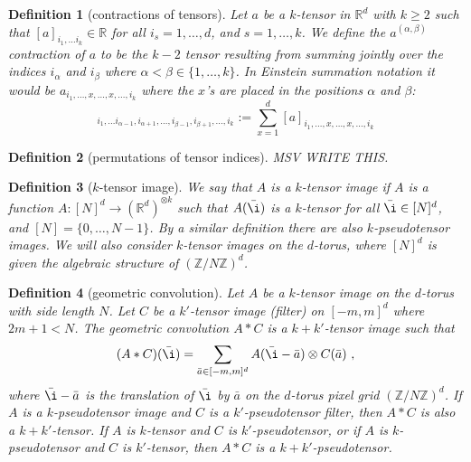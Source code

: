 \documentclass{article}
\theoremstyle{plain}
\newtheorem{definition}{Definition}
\begin{document}
\begin{definition}[contractions of tensors]
Let $a$ be a $k$-tensor in $\mathbb R^d$ with $k\geq 2$ such that $[a]_{i_1,\ldots i_k}\in \mathbb R$ for all $i_s = 1,\ldots, d$, and $s=1,\ldots, k$. We define the $a^{(\alpha,\beta)}$ contraction of $a$ to be the $k-2$ tensor resulting from summing jointly over the indices $i_\alpha$ and $i_\beta$ where $\alpha < \beta \in\{1,\ldots, k\}$. In Einstein summation notation it would be $a_{i_1, \ldots, x, \ldots , x, \ldots, i_k}$ where the $x$'s are placed in the positions $\alpha$ and $\beta$:
\begin{equation}
[a^{(\alpha,\beta)}]_{i_1,\ldots i_{\alpha-1}, i_{\alpha+1}, \ldots, i_{\beta-1}, i_{\beta+1} , \ldots, i_k} := \sum_{x=1}^d [a]_{i_1, \ldots, x, \ldots , x, \ldots, i_k}
\end{equation}
\end{definition}

\begin{definition}[permutations of tensor indices]
MSV WRITE THIS.
\end{definition}

\begin{definition}[$k$-tensor image]
We say that $A$ is a $k$-tensor image if $A$ is a function $A: [N]^d \to (\mathbb R^d)^{\otimes k}$ such that $A(\bar \i)$ is a $k$-tensor for all $\bar \i \in [N]^d$, and $[N]=\{0,\ldots, N-1\}$.
By a similar definition there are also $k$-pseudotensor images.
We will also consider $k$-tensor images on the $d$-torus, where $[N]^d$ is given the algebraic structure of $(\mathbb Z / N\mathbb Z)^d$.
\end{definition}

\begin{definition}[geometric convolution]
Let $A$ be a $k$-tensor image on the $d$-torus with side length $N$.
Let $C$ be a $k'$-tensor image (filter) on $[-m, m]^d$ where $2m+1<N$.
The geometric convolution $A\ast C$ is a $k+k'$-tensor image such that
\begin{equation}
    (A\ast C)(\bar\i) = \sum_{\bar a\in[-m, m]^d} A(\bar\i - \bar a)\otimes C(\bar a) ~,
\end{equation}
where $\bar\i - \bar a$ is the translation of $\bar\i$ by $\bar a$ on the $d$-torus pixel grid $(\mathbb Z / N\mathbb Z)^d$.
If $A$ is a $k$-pseudotensor image and $C$ is a $k'$-pseudotensor filter, then $A\ast C$ is also a $k+k'$-tensor.
If $A$ is $k$-tensor and $C$ is $k'$-pseudotensor, or if $A$ is $k$-pseudotensor and $C$ is $k'$-tensor, then $A\ast C$ is a $k+k'$-pseudotensor.
\end{definition}
\end{document}
